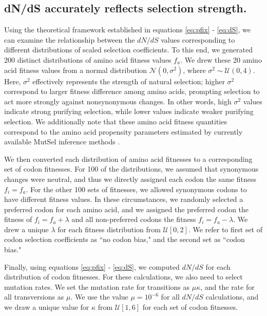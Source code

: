 \documentclass{pnastwo}
\begin{document}
\begin{article}
				
\subsection*{dN/dS accurately reflects selection strength.}

Using the theoretical framework established in equations \eqref{eq:pfix} - \eqref{eq:dS}, we can examine the relationship between the $dN/dS$ values corresponding to different distributions of scaled selection coefficients. To this end, we generated 200 distinct distributions of amino acid fitness values $f_a$. We drew these 20 amino acid fitness values from a normal distribution $\mathcal{N}(0,\sigma^2)$, where $\sigma^2 \sim \mathcal{U}(0,4)$. Here, $\sigma^2$ effectively represents the strength of natural selection; higher $\sigma^2$ correspond to larger fitness difference among amino acids, prompting selection to act more strongly against nonsynonymous changes. In other words, high $\sigma^2$ values indicate strong purifying selection, while lower values indicate weaker purifying selection. We additionally note that these amino acid fitness quantities correspond to the amino acid propensity parameters estimated by currently available MutSel inference methods \cite{RodrigueLartillot2014,Tamurietal2014}.

We then converted each distribution of amino acid fitnesses to a corresponding set of codon fitnesses. For 100 of the distributions, we assumed that synonymous changes were neutral, and thus we directly assigned each codon the same fitness $f_i = f_a$. For the other 100 sets of fitnesses, we allowed synonymous codons to have different fitness values. In these circumstances, we randomly selected a preferred codon for each amino acid, and we assigned the preferred codon the fitness of $f_i = f_a + \lambda$ and all non-preferred codons the fitness $f_i = f_a - \lambda$. We drew a unique $\lambda$ for each fitness distribution from $\mathcal{U}[0,2]$. We refer to first set of codon selection coefficients as ``no codon bias," and the second set as ``codon bias." 

Finally, using equations \eqref{eq:pfix} - \eqref{eq:dS}, we computed $dN/dS$ for each distribution of codon fitnesses. For these calculations, we also need to select mutation rates. We set the mutation rate for transitions as $\mu\kappa$, and the rate for all transversions as $\mu$. We use the value $\mu = 10^{-6}$ for all $dN/dS$ calculations, and we draw a unique value for $\kappa$ from $\mathcal{U}[1,6]$ for each set of codon fitnesses.


\end{article}
\end{document}
